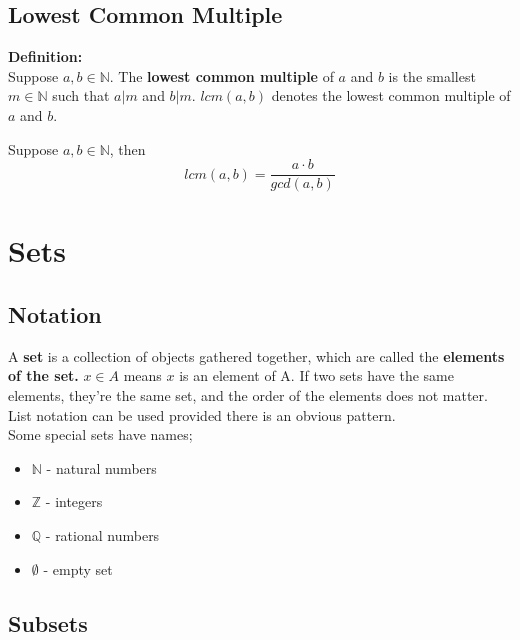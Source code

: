 \documentclass{report}
\newenvironment{frameblue}[1][BlueViolet]
  {\begin{tcolorbox}[colframe=#1,colback=white]}
  {\end{tcolorbox}}
\begin{document}
\section{Lowest Common Multiple}

\begin{frameblue}
    \textbf{Definition:}\\
    Suppose $a,b \in \mathbb{N}$. The \textbf{lowest common multiple} of $a$ and $b$ is the smallest $m \in \mathbb{N}$ such that $a | m$ and $b | m$. $lcm(a,b)$ denotes the lowest common multiple of $a$ and $b$.
\end{frameblue}

Suppose $a, b \in \mathbb{N}$, then
\begin{equation}
    lcm(a,b) = \frac{a \cdot b}{gcd(a,b)}
\end{equation}

\chapter{Sets}
\section{Notation}

A \textbf{set} is a collection of objects gathered together, which are called the \textbf{elements of the set.} $x \in A$ means $x$ is an element of A. If two sets have the same elements, they're the same set, and the order of the elements does not matter. List notation can be used provided there is an obvious pattern.\\

Some special sets have names;
\begin{itemize}
    \item $\mathbb{N}$ - natural numbers
    \item $\mathbb{Z}$ - integers
    \item $\mathbb{Q}$ - rational numbers
    \item $\emptyset$ - empty set
\end{itemize}

\section{Subsets}
\end{document}
